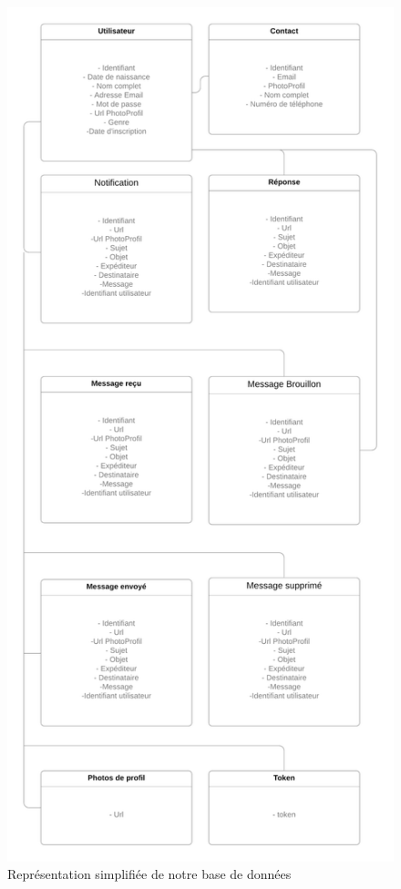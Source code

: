 \documentclass[french]{report}
\begin{document}
\begin{titlepage}
\begin{figure}[H]
    \includegraphics[scale=0.18 ]{Représentation simplifiée de notre base de données}
    \caption{Représentation simplifiée de notre base de données}
    \label{fig:Representation}
\end{figure}

\end{titlepage}
\end{document}
